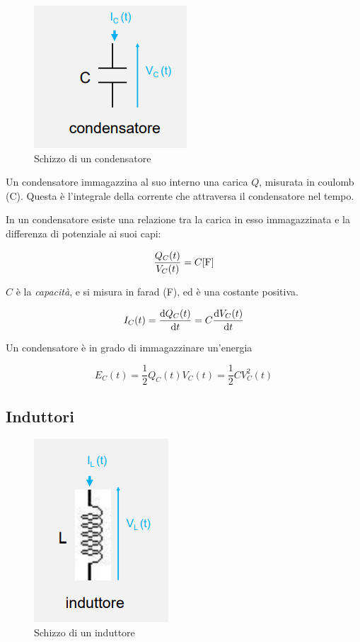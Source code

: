 \documentclass{article}
\begin{document}
\begin{figure}[h!]
  \centering
  \includegraphics[scale=0.65]{IM_condensatore}
  \caption{Schizzo di un condensatore}
  \label{Schema_condensatore}
\end{figure}

Un condensatore immagazzina al suo interno una carica $Q$, misurata in coulomb (C). Questa è l'integrale della corrente che attraversa il condensatore nel tempo.

In un condensatore esiste una relazione tra la carica in esso immagazzinata e la differenza di potenziale ai suoi capi:

\[\frac{Q_C (t)}{V_C (t)} = C [\textrm F]\]

$C$ è la \textit{capacità}, e si misura in farad (F), ed è una costante positiva.

\[I_C (t) = \frac{\textrm d Q_C (t)}{\textrm d t} = C \frac{\textrm d V_C (t)}{\textrm d t}\]

Un condensatore è in grado di immagazzinare un'energia

\[E_C (t) = \frac{1}{2} Q_C (t) V_C (t) = \frac{1}{2} C V_C^2 (t)\]










\subsection{Induttori}

\begin{figure}[h]
  \centering
  \includegraphics[scale=0.6]{IM_induttore}
  \caption{Schizzo di un induttore}
  \label{Schema_induttore}
\end{figure}
\end{document}
